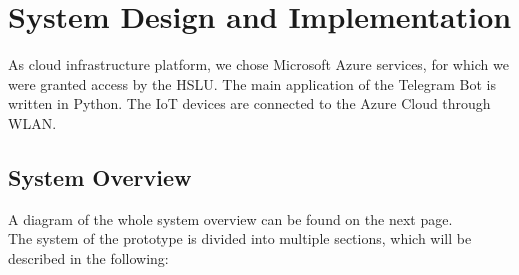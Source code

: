\documentclass[a4paper]{article}
\begin{document}
	\newpage
	\section{System Design and Implementation}
	As cloud infrastructure platform, we chose Microsoft Azure services, for which we were granted access by the HSLU.
	The main application of the Telegram Bot is written in Python.
	The IoT devices are connected to the Azure Cloud through WLAN.
	
		\subsection{System Overview}
		
	
		A diagram of the whole system overview can be found on the next page.\\
		The system of the prototype is divided into multiple sections, which will be described in the following:\\
		
\end{document}
